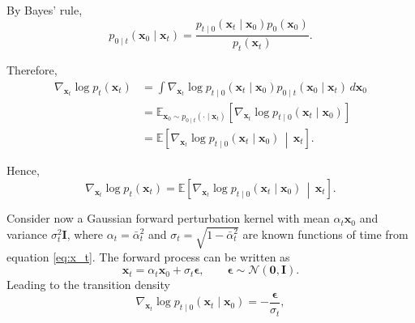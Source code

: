 \documentclass[11pt,a4paper]{article}
\begin{document}
\begin{compactproof}[title={Proof}]
By Bayes' rule,
\begin{equation*}
p_{0\mid t}(\mathbf{x}_0\mid \mathbf{x}_t)
=
\frac{
p_{t\mid 0}(\mathbf{x}_t\mid \mathbf{x}_0)
p_0(\mathbf{x}_0)
}{
p_t(\mathbf{x}_t)
}.
\end{equation*}

Therefore,
\begin{align*}
\nabla_{\mathbf{x}_t}\log p_t(\mathbf{x}_t)
&=
\int
\nabla_{\mathbf{x}_t}
\log p_{t\mid 0}(\mathbf{x}_t\mid \mathbf{x}_0)
p_{0\mid t}(\mathbf{x}_0\mid \mathbf{x}_t)
\,d\mathbf{x}_0
\\
&=
\mathbb{E}_{\mathbf{x}_0\sim
p_{0\mid t}(\cdot\mid\mathbf{x}_t)}
\left[
\nabla_{\mathbf{x}_t}
\log p_{t\mid 0}(\mathbf{x}_t\mid \mathbf{x}_0)
\right]
\\
&=
\mathbb{E}
\left[
\nabla_{\mathbf{x}_t}
\log p_{t\mid 0}(\mathbf{x}_t\mid \mathbf{x}_0)
\,\middle|\,
\mathbf{x}_t
\right].
\end{align*}

Hence,
\begin{equation*}
\boxed{
\nabla_{\mathbf{x}_t}\log p_t(\mathbf{x}_t)
=
\mathbb{E}
\left[
\nabla_{\mathbf{x}_t}
\log p_{t\mid 0}(\mathbf{x}_t\mid \mathbf{x}_0)
\,\middle|\,
\mathbf{x}_t
\right].
}
\end{equation*}
\end{compactproof}




Consider now a Gaussian forward perturbation kernel with mean $\alpha_t\mathbf{x}_0$ and variance $\sigma_t^2\mathbf{I}$, where $\alpha_t=\bar{\alpha}_t^2$ and $\sigma_t = \sqrt{1 - \bar{\alpha}_t^2}$ are known functions of time from equation \eqref{eq:x_t}. The forward process can be written as
\begin{equation*}
\mathbf{x}_t
=
\alpha_t\mathbf{x}_0
+
\sigma_t\boldsymbol{\epsilon},
\qquad
\boldsymbol{\epsilon}\sim\mathcal{N}(\mathbf{0},\mathbf{I}).
\end{equation*}
Leading to the transition density
\begin{equation}
    \nabla_{\mathbf{x}_t}
    \log p_{t\mid 0}(\mathbf{x}_t\mid\mathbf{x}_0)
    =
    -\frac{\boldsymbol{\epsilon}}{\sigma_t},
\end{equation}
\end{document}

